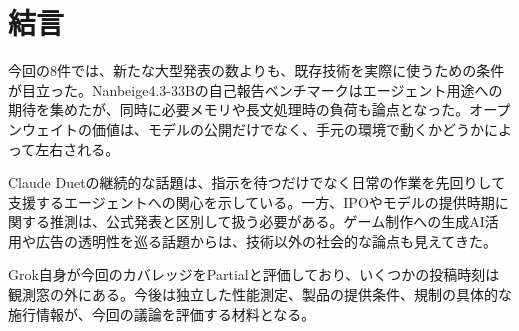 \section*{結言}
今回の8件では、新たな大型発表の数よりも、既存技術を実際に使うための条件が目立った。Nanbeige4.3-33Bの自己報告ベンチマークはエージェント用途への期待を集めたが、同時に必要メモリや長文処理時の負荷も論点となった。オープンウェイトの価値は、モデルの公開だけでなく、手元の環境で動くかどうかによって左右される。

Claude Duetの継続的な話題は、指示を待つだけでなく日常の作業を先回りして支援するエージェントへの関心を示している。一方、IPOやモデルの提供時期に関する推測は、公式発表と区別して扱う必要がある。ゲーム制作への生成AI活用や広告の透明性を巡る話題からは、技術以外の社会的な論点も見えてきた。

Grok自身が今回のカバレッジをPartialと評価しており、いくつかの投稿時刻は観測窓の外にある。今後は独立した性能測定、製品の提供条件、規制の具体的な施行情報が、今回の議論を評価する材料となる。
